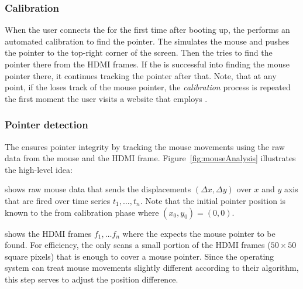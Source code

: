 \subsubsection{\bfseries Calibration}\label{sec:systemDesign:analysis:calibration} When the user connects the \device for the first time after booting up, the \device performs an automated calibration to find the pointer. The \device simulates the mouse and pushes the pointer to the top-right corner of the screen. Then the \device tries to find the pointer there from the HDMI frames. If the \device is successful into finding the mouse pointer there, it continues tracking the pointer after that. Note, that at any point, if the \device loses track of the mouse pointer, the \emph{calibration} process is repeated the first moment the user visits a website that employs \name.

\subsubsection{\bfseries Pointer detection} The \device ensures pointer integrity by tracking the mouse movements using the raw data from the mouse and the HDMI frame.  Figure~\ref{fig:mouseAnalysis} illustrates the high-level idea: 

\begin{mylist}
\item[]\one shows raw mouse data that sends the displacements $(\Delta x, \Delta y)$ over $x$ and $y$ axis that are fired over time series $t_1,\ldots, t_n$. Note that the initial pointer position is known to the \device from calibration phase where $(x_0, y_0) = (0, 0)$.  
\item[]\two shows the HDMI frames $f_1,\ldots f_n$ where the \device expects the mouse pointer to be found. For efficiency, the \device only scans a small portion of the HDMI frames ($50 \times 50$ square pixels) that is enough to cover a mouse pointer. Since the operating system can treat mouse movements slightly different according to their algorithm, this step serves to adjust the position difference.
\end{mylist}


